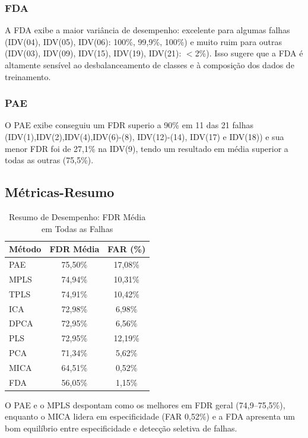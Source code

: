 \documentclass[journal]{IEEEtran}
\begin{document}
\subsubsection{FDA}

A FDA exibe a maior variância de desempenho: excelente para algumas falhas (IDV(04), IDV(05), IDV(06): 100\%, 99,9\%, 100\%) e muito ruim para outras (IDV(03), IDV(09), IDV(15), IDV(19), IDV(21): $<$2\%). Isso sugere que a FDA é altamente sensível ao desbalanceamento de classes e à composição dos dados de treinamento.

\subsubsection{PAE}

O PAE exibe conseguiu um FDR  superio a 90\% em 11 das 21 falhas (IDV(1),IDV(2),IDV(4),IDV(6)-(8), IDV(12)-(14), IDV(17) e IDV(18)) e sua menor FDR foi de 27,1\% na IDV(9), tendo um resultado em média superior a todas as outras (75,5\%).

\subsection{Métricas-Resumo}
\label{subsec:summary_metrics}

\begin{table}[H]
\centering
\caption{Resumo de Desempenho: FDR Média em Todas as Falhas}
\label{tab:average_fdr}
\small
\begin{tabular}{lcc}
\toprule
\rowcolor{gray!20}
\textbf{Método} & \textbf{FDR Média} & \textbf{FAR (\%)} \\
\midrule
PAE   & 75,50\% & 17,08\% \\
MPLS  & 74,94\% & 10,31\% \\
TPLS  & 74,91\% & 10,42\% \\
ICA   & 72,98\% & 6,98\% \\
DPCA  & 72,95\% & 6,56\% \\
PLS   & 72,95\% & 12,19\% \\
PCA   & 71,34\% & 5,62\% \\
MICA  & 64,51\% & 0,52\% \\
FDA   & 56,05\% & 1,15\% \\
\bottomrule
\end{tabular}
\end{table}

O PAE e o MPLS despontam como os melhores em FDR geral (74,9--75,5\%), enquanto o MICA lidera em especificidade (FAR 0,52\%) e a FDA apresenta um bom equilíbrio entre especificidade e detecção seletiva de falhas.
\end{document}
